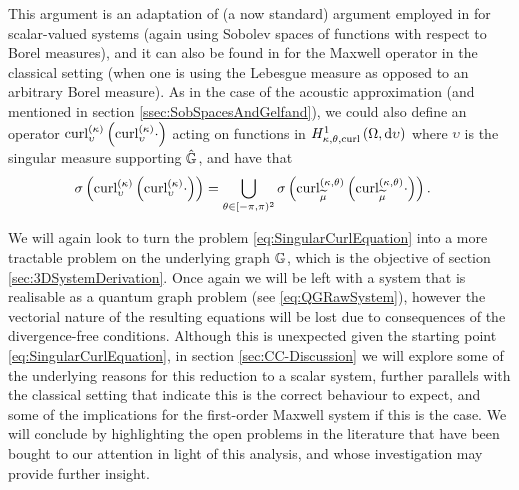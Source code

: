This argument is an adaptation of (a now standard) argument employed in \cite[Page 987]{zhikov2000extension} for scalar-valued systems (again using Sobolev spaces of functions with respect to Borel measures), and it can also be found in \cite[Section 3.1]{suslina2005homogenization} for the Maxwell operator in the classical setting (when one is using the Lebesgue measure as opposed to an arbitrary Borel measure).
As in the case of the acoustic approximation (and mentioned in section \ref{ssec:SobSpacesAndGelfand}), we could also define an operator $\mathrm{curl}_{\upsilon}^{(\kappa)}\left(  \mathrm{curl}_{\upsilon}^{(\kappa)} \cdot  \right)$ acting on functions in $H^1_{\kappa,\theta,\mathrm{curl}}\left( \Omega, \mathrm{d}\upsilon \right)$ where $\upsilon$ is the singular measure supporting $\hat{\mathbb{G}}$, and have that
\begin{align*}
	\sigma\left(  \mathrm{curl}_{\upsilon}^{(\kappa)}\left(  \mathrm{curl}_{\upsilon}^{(\kappa)} \cdot  \right)  \right)
	&= \bigcup_{\theta\in[-\pi,\pi)^2} \sigma\left(  \mathrm{curl}_{\widetilde{\mu}}^{\left( \kappa, \theta \right)}\left(  \mathrm{curl}_{\widetilde{\mu}}^{\left( \kappa, \theta \right)} \cdot  \right)  \right).
\end{align*}

We will again look to turn the problem \eqref{eq:SingularCurlEquation} into a more tractable problem on the underlying graph $\mathbb{G}$, which is the objective of section \ref{sec:3DSystemDerivation}.
Once again we will be left with a system that is realisable as a quantum graph problem (see \eqref{eq:QGRawSystem}), however the vectorial nature of the resulting equations will be lost due to consequences of the divergence-free conditions.
Although this is unexpected given the starting point \eqref{eq:SingularCurlEquation}, in section \ref{sec:CC-Discussion} we will explore some of the underlying reasons for this reduction to a scalar system, further parallels with the classical setting that indicate this is the correct behaviour to expect, and some of the implications for the first-order Maxwell system if this is the case.
We will conclude by highlighting the open problems in the literature that have been bought to our attention in light of this analysis, and whose investigation may provide further insight.